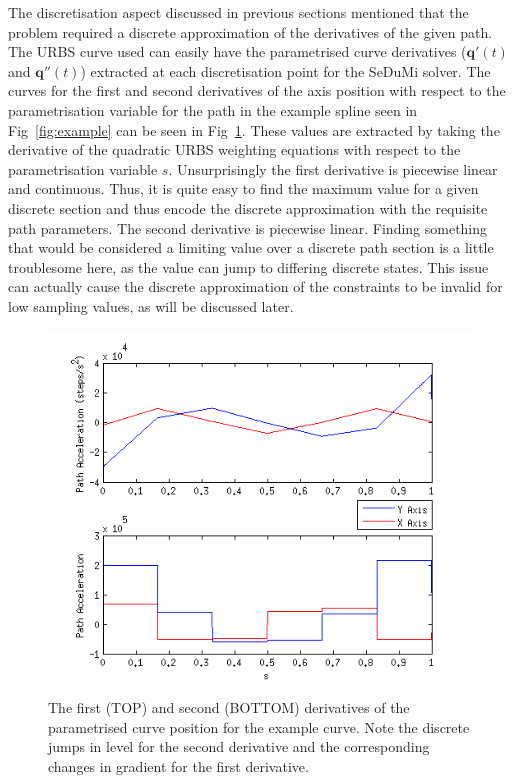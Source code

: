 The discretisation aspect discussed in previous sections mentioned that the problem required a discrete approximation of the derivatives of the given path. The URBS curve used can easily have the parametrised curve derivatives ($\textbf{q}'(t)$ and $\textbf{q}''(t)$) extracted at each discretisation point for the SeDuMi solver. The curves for the first and second derivatives of the axis position with respect to the parametrisation variable for the path in the example spline seen in Fig~\ref{fig:example} can be seen in Fig~\ref{fig:xy_dds_ds}. These values are extracted by taking the derivative of the quadratic URBS weighting equations with respect to the parametrisation variable $s$.
Unsurprisingly the first derivative is piecewise linear and continuous. Thus, it is quite easy to find the maximum value for a given discrete section and thus encode the discrete approximation with the requisite path parameters.
The second derivative is piecewise linear. Finding something that would be considered a limiting value over a discrete path section is a little troublesome here, as the value can jump to differing discrete states. This issue can actually cause the discrete approximation of the constraints to be invalid for low sampling values, as will be discussed later.

\begin{figure}[htbp]
\includegraphics[width=\textwidth]{figures/optimisation/xy_dds_ds.png}
\caption[Parametrised curve derivatives]{
The first (TOP) and second (BOTTOM) derivatives of the parametrised curve position for the example curve. Note the discrete jumps in level for the second derivative and the corresponding changes in gradient for the first derivative.
\label{fig:xy_dds_ds}}
\end{figure}

